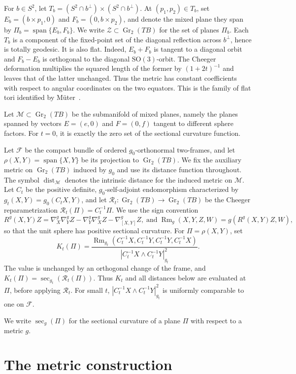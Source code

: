 \documentclass[11pt]{article}
\theoremstyle{definition}
\theoremstyle{remark}
\newcommand{\cM}{\mathcal M}
\newcommand{\cZ}{\mathcal Z}
\newcommand{\Gr}{\operatorname{Gr}}
\newcommand{\Rm}{\operatorname{Rm}}
\newcommand{\Span}{\operatorname{span}}
\newcommand{\dist}{\operatorname{dist}}
\begin{document}
For $b\in S^2$, let
$T_b=(S^2\cap b^\perp)\times(S^2\cap b^\perp)$.  At
$(p_1,p_2)\in T_b$, set
$E_b=(b\times p_1,0)$ and $F_b=(0,b\times p_2)$, and denote the mixed
plane they span by $\Pi_b=\Span\{E_b,F_b\}$.
We write $\cZ\subset\Gr_2(TB)$ for the set of planes $\Pi_b$.  Each $T_b$
is a component of the fixed-point set of the
diagonal reflection across $b^\perp$, hence is totally geodesic.  It is
also flat.  Indeed, $E_b+F_b$ is tangent to a diagonal orbit and
$F_b-E_b$ is orthogonal to the diagonal $\mathrm{SO}(3)$-orbit.  The Cheeger
deformation multiplies the
squared length of the former by $(1+2t)^{-1}$ and leaves that of the latter
unchanged.  Thus the metric has constant coefficients with respect to angular
coordinates on the two equators.  This is the family of flat tori identified by
M\"uter~\cite[Satz~4.26]{Muter1987}.

Let $\cM\subset\Gr_2(TB)$ be the submanifold of mixed planes, namely the
planes spanned by vectors $E=(e,0)$ and $F=(0,f)$ tangent to different
sphere factors.  For $t=0$, it is exactly the zero set of the
sectional curvature function.

Let $\mathscr F$ be the compact bundle of ordered $g_0$-orthonormal
two-frames, and let
$\rho(X,Y)=\Span\{X,Y\}$ be its projection to $\Gr_2(TB)$.
We fix the auxiliary metric on $\Gr_2(TB)$ induced by $g_0$ and use its
distance function throughout.  The symbol $\dist_{\cM}$ denotes the intrinsic
distance for the induced metric on $\cM$.  Let $C_t$ be the positive definite,
$g_0$-self-adjoint endomorphism characterized by
$g_t(X,Y)=g_0(C_t X,Y)$, and let
$\mathcal R_t:\Gr_2(TB)\to\Gr_2(TB)$ be the Cheeger
reparametrization $\mathcal R_t(\Pi)=C_t^{-1}\Pi$.
We use the sign convention
\[
 R^g(X,Y)Z=\nabla_X^g\nabla_Y^g Z-\nabla_Y^g\nabla_X^g Z
 -\nabla_{[X,Y]}^g Z,
 \;\text{and}\;
 \Rm_g(X,Y,Z,W)=g(R^g(X,Y)Z,W),
\]
so that the unit sphere has positive sectional curvature.
For $\Pi=\rho(X,Y)$, set
\[
 K_t(\Pi)=
 \frac{\Rm_{g_t}(C_t^{-1}X,C_t^{-1}Y,C_t^{-1}Y,C_t^{-1}X)}
 {|C_t^{-1}X\wedge C_t^{-1}Y|_{g_t}^2}.
\]
The value is unchanged by an orthogonal change of the frame, and
$K_t(\Pi)=\sec_{g_t}(\mathcal R_t(\Pi))$.  Thus $K_t$ and all distances below are evaluated at
$\Pi$, before applying $\mathcal R_t$.  For small $t$,
$|C_t^{-1}X\wedge C_t^{-1}Y|_{g_t}^2$ is uniformly comparable to one on
$\mathscr F$.

We write $\sec_g(\Pi)$ for the sectional curvature of a plane $\Pi$ with
respect to a metric $g$.

\section{The metric construction}                                             \label{sec:construction}
\end{document}
